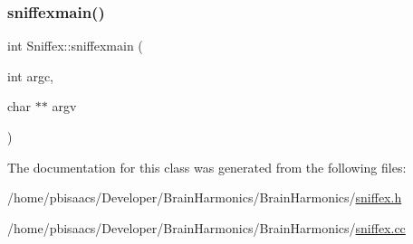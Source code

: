 \mbox{\label{classSniffex_a41e146d588c285c94c0beee223d8552b}} 
\subsubsection{\texorpdfstring{sniffexmain()}{sniffexmain()}}
{\footnotesize\ttfamily int Sniffex\+::sniffexmain (\begin{DoxyParamCaption}\item[{int}]{argc,  }\item[{char $\ast$$\ast$}]{argv }\end{DoxyParamCaption})}



The documentation for this class was generated from the following files\+:\begin{DoxyCompactItemize}
\item 
/home/pbisaacs/\+Developer/\+Brain\+Harmonics/\+Brain\+Harmonics/\mbox{\hyperlink{sniffex_8h}{sniffex.\+h}}\item 
/home/pbisaacs/\+Developer/\+Brain\+Harmonics/\+Brain\+Harmonics/\mbox{\hyperlink{sniffex_8cc}{sniffex.\+cc}}\end{DoxyCompactItemize}
